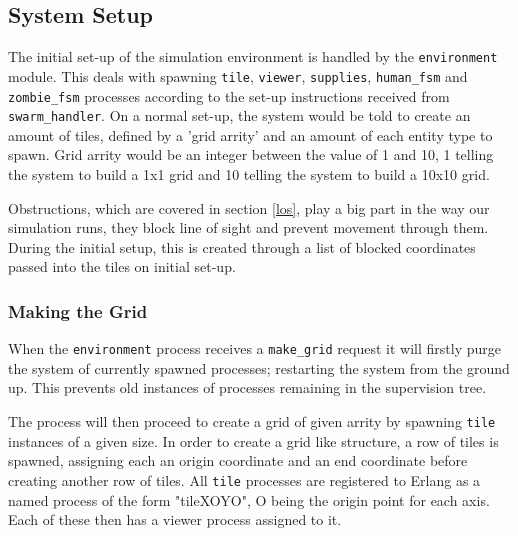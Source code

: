 \subsection{System Setup}
\label{system_setup}
The initial set-up of the simulation environment is handled by the \verb+environment+ module. This deals with spawning \verb+tile+, \verb+viewer+, \verb+supplies+, \verb+human_fsm+ and \verb+zombie_fsm+ processes according to the set-up instructions received from \verb+swarm_handler+. On a normal set-up, the system would be told to create an amount of tiles, defined by a 'grid arrity' and an amount of each entity type to spawn. Grid arrity would be an integer between the value of 1 and 10, 1 telling the system to build a 1x1 grid and 10 telling the system to build a 10x10 grid.

Obstructions, which are covered in section \ref{los}, play a big part in the way our simulation runs, they block line of sight and prevent movement through them. During the initial setup, this is created through a list of blocked coordinates passed into the tiles on initial set-up.

\subsubsection{Making the Grid}
When the \verb+environment+ process receives a \verb+make_grid+ request it will firstly purge the system of currently spawned processes; restarting the system from the ground up. This prevents old instances of processes remaining in the supervision tree.

The process will then proceed to create a grid of given arrity by spawning \verb+tile+ instances of a given size. In order to create a grid like structure, a row of tiles is spawned, assigning each an origin coordinate and an end coordinate before creating another row of tiles. All \verb+tile+ processes are registered to Erlang as a named process of the form "tileXOYO", O being the origin point for each axis. Each of these then has a viewer process assigned to it.

\clearpage
\endinput
